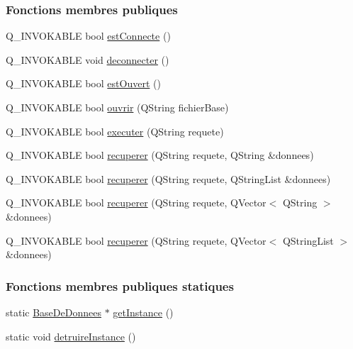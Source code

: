 \subsubsection*{Fonctions membres publiques}
\begin{DoxyCompactItemize}
\item 
Q\+\_\+\+I\+N\+V\+O\+K\+A\+B\+LE bool \hyperlink{class_base_de_donnees_a00388973f3ec42e5c8e76e7af7e124b2}{est\+Connecte} ()
\item 
Q\+\_\+\+I\+N\+V\+O\+K\+A\+B\+LE void \hyperlink{class_base_de_donnees_ae780999d25a26a0e4dbe0706a4785978}{deconnecter} ()
\item 
Q\+\_\+\+I\+N\+V\+O\+K\+A\+B\+LE bool \hyperlink{class_base_de_donnees_af9ac332082ffd0dd35e412cefabe5e9c}{est\+Ouvert} ()
\item 
Q\+\_\+\+I\+N\+V\+O\+K\+A\+B\+LE bool \hyperlink{class_base_de_donnees_a7f6a5510b08017b0d99115a84252f186}{ouvrir} (Q\+String fichier\+Base)
\item 
Q\+\_\+\+I\+N\+V\+O\+K\+A\+B\+LE bool \hyperlink{class_base_de_donnees_aa8de5f8f8bb17edc43f5c0ee33712081}{executer} (Q\+String requete)
\item 
Q\+\_\+\+I\+N\+V\+O\+K\+A\+B\+LE bool \hyperlink{class_base_de_donnees_a77539baad389f5acf754cd2cd452403e}{recuperer} (Q\+String requete, Q\+String \&donnees)
\item 
Q\+\_\+\+I\+N\+V\+O\+K\+A\+B\+LE bool \hyperlink{class_base_de_donnees_a2a5c461fa11d404810ae3ebe035d5190}{recuperer} (Q\+String requete, Q\+String\+List \&donnees)
\item 
Q\+\_\+\+I\+N\+V\+O\+K\+A\+B\+LE bool \hyperlink{class_base_de_donnees_af9a76eb2b12df784280c379a4b22af62}{recuperer} (Q\+String requete, Q\+Vector$<$ Q\+String $>$ \&donnees)
\item 
Q\+\_\+\+I\+N\+V\+O\+K\+A\+B\+LE bool \hyperlink{class_base_de_donnees_a68dd0d62ba03b9e8e5aa759d0666cb59}{recuperer} (Q\+String requete, Q\+Vector$<$ Q\+String\+List $>$ \&donnees)
\end{DoxyCompactItemize}
\subsubsection*{Fonctions membres publiques statiques}
\begin{DoxyCompactItemize}
\item 
static \hyperlink{class_base_de_donnees}{Base\+De\+Donnees} $\ast$ \hyperlink{class_base_de_donnees_a1cea5a739386ba076c7f265205e82608}{get\+Instance} ()
\item 
static void \hyperlink{class_base_de_donnees_a457401c0816b888c77ce915997545f4e}{detruire\+Instance} ()
\end{DoxyCompactItemize}

